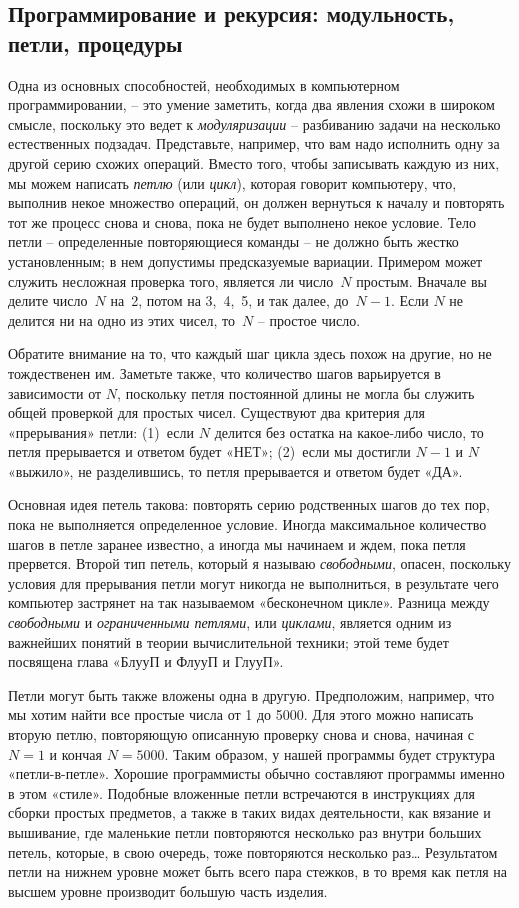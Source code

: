 \documentclass[../main.tex]{subfiles}
\begin{document}
\subsection{Программирование и рекурсия: модульность, петли, процедуры}

Одна из основных способностей, необходимых в компьютерном программировании, \--- это умение заметить, когда два явления схожи в широком смысле, поскольку это ведет к \emph{модуляризации} \--- разбиванию задачи на несколько естественных подзадач. Представьте, например, что вам надо исполнить одну за другой серию схожих операций. Вместо того, чтобы записывать каждую из них, мы можем написать \emph{петлю} (или \emph{цикл}), которая говорит компьютеру, что, выполнив некое множество операций, он должен вернуться к началу и повторять тот же процесс снова и снова, пока не будет выполнено некое условие. Тело петли \--- определенные повторяющиеся команды \--- не должно быть жестко установленным; в нем допустимы предсказуемые вариации. Примером может служить несложная проверка того, является ли число~$N$ простым. Вначале вы делите число~$N$ на~2, потом на 3,~4,~5, и так далее, до~$N-1$. Если $N$ не делится ни на одно из этих чисел, то~$N$ \--- простое число.

Обратите внимание на то, что каждый шаг цикла здесь похож на другие, но не тождественен им. Заметьте также, что количество шагов варьируется в зависимости от $N$, поскольку петля постоянной длины не могла бы служить общей проверкой для простых чисел. Существуют два критерия для «прерывания» петли: (1)~если $N$ делится без остатка на какое-либо число, то петля прерывается и ответом будет «НЕТ»; (2)~если мы достигли $N-1$ и $N$ «выжило», не разделившись, то петля прерывается и ответом будет «ДА».

Основная идея петель такова: повторять серию родственных шагов до тех пор, пока не выполняется определенное условие. Иногда максимальное количество шагов в петле заранее известно, а иногда мы начинаем и ждем, пока петля прервется. Второй тип петель, который я называю \emph{свободными}, опасен, поскольку условия для прерывания петли могут никогда не выполниться, в результате чего компьютер застрянет на так называемом «бесконечном цикле». Разница между \emph{свободными} и \emph{ограниченными петлями}, или \emph{циклами}, является одним из важнейших понятий в теории вычислительной техники; этой теме будет посвящена глава «БлууП и ФлууП и ГлууП».

Петли могут быть также вложены одна в другую. Предположим, например, что мы хотим найти все простые числа от 1 до 5000. Для этого можно написать вторую петлю, повторяющую описанную проверку снова и снова, начиная с $N=1$ и кончая $N=5000$. Таким образом, у нашей программы будет структура «петли-в-петле». Хорошие программисты обычно составляют программы именно в этом «стиле». Подобные вложенные петли встречаются в инструкциях для сборки простых предметов, а также в таких видах деятельности, как вязание и вышивание, где маленькие петли повторяются несколько раз внутри больших петель, которые, в свою очередь, тоже повторяются несколько раз\ldots{} Результатом петли на нижнем уровне может быть всего пара стежков, в то время как петля на высшем уровне производит большую часть изделия.
\end{document}
